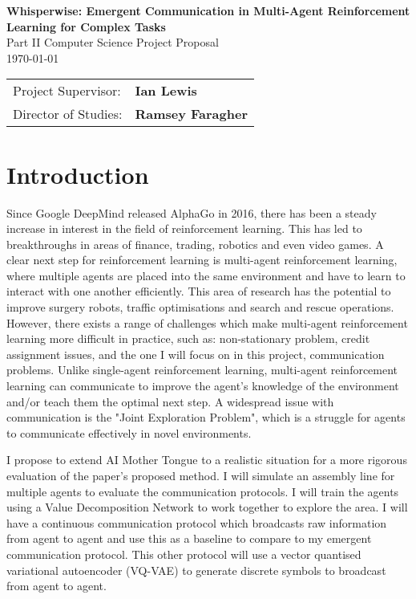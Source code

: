 \documentclass[20pt]{article}
\begin{document}
\begin{center}
  \Huge
  \textbf{Whisperwise: Emergent Communication in Multi-Agent Reinforcement Learning for Complex Tasks} \\[4mm]
  \Large
  Part II Computer Science Project Proposal \\[2mm]
  \today \\[8mm]
\end{center}

{\large
\begin{tabular}{ll}
  Project Supervisor:  & \bf Ian Lewis                \\
  Director of Studies: & \bf Ramsey Faragher                   \\
\end{tabular}
}



\section{Introduction}

\large
Since Google DeepMind released AlphaGo in 2016, there has been a steady increase in interest in the field of reinforcement learning. This has led to breakthroughs in areas of finance, trading, robotics and even video games. A clear next step for reinforcement learning is multi-agent reinforcement learning, where multiple agents are placed into the same environment and have to learn to interact with one another efficiently. This area of research has the potential to improve surgery robots, traffic optimisations and search and rescue operations. However, there exists a range of challenges which make multi-agent reinforcement learning more difficult in practice, such as: non-stationary problem, credit assignment issues, and the one I will focus on in this project, communication problems. Unlike single-agent reinforcement learning, multi-agent reinforcement learning can communicate to improve the agent's knowledge of the environment and/or teach them the optimal next step. A widespread issue with communication is the "Joint Exploration Problem", which is a struggle for agents to communicate effectively in novel environments.

I propose to extend AI Mother Tongue\cite{AIMotherTongue} to a realistic situation for a more rigorous evaluation of the paper's proposed method. I will simulate an assembly line for multiple agents to evaluate the communication protocols. I will train the agents using a Value Decomposition Network to work together to explore the area. I will have a continuous communication protocol which broadcasts raw information from agent to agent and use this as a baseline to compare to my emergent communication protocol. This other protocol will use a vector quantised variational autoencoder (VQ-VAE) to generate discrete symbols to broadcast from agent to agent.
\end{document}
